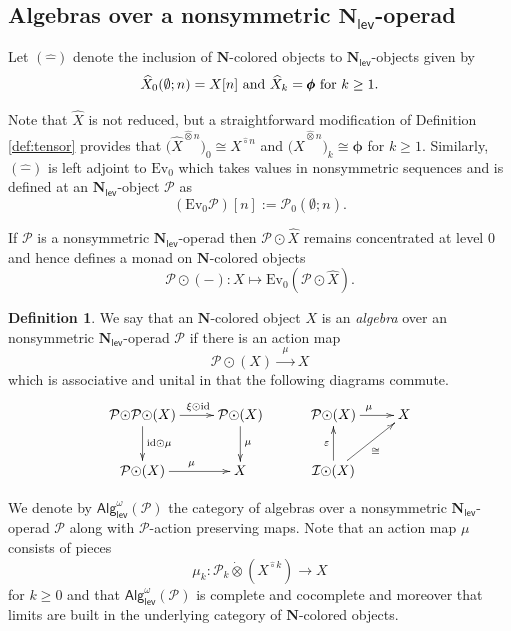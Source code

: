 \documentclass[11pt]{amsart}
\theoremstyle{definition}
\newtheorem{definition}[subsection]{Definition}
\theoremstyle{remark}
\newcommand{\AlgN}[1]{\mathsf{Alg}^{\omega}_{\mathsf{lev}}\left(\mathcal{#1}\right)}
\newcommand{\id}{\mathrm{id}}
\newcommand{\Cal}[1]{\mathcal{#1}}
\newcommand{\circhat}{\hat{\circ}}
\newcommand{\circdot}{{\odot}}
\newcommand{\tensorhat}{\hat{\otimes}}
\newcommand{\tensordot}{\dot{\otimes}}
\newcommand{\Nl}{\mathbf{N}_{\mathsf{lev}}}
\newcommand{\ptC}{\pmb{\phi}}
\begin{document}
\subsection{Algebras over a nonsymmetric $\Nl$-operad}
Let $(\widehat{-})$ denote the inclusion of $\mathbf{N}$-colored objects to $\Nl$-objects given by \[\text{$\widehat{X}_0(\emptyset;n)=X[n]$ and $\widehat{X}_k=\ptC$ for $ k\geq 1$.}\] 

Note that $\widehat{X}$ is not reduced, but a straightforward modification of Definition \ref{def:tensor} provides that $\big(\widehat{X}^{\tensorhat n}\big)_0\cong X^{\circhat n}$ and $\big(\widehat{X}^{\tensorhat n}\big)_k\cong \ptC$ for $k\geq 1$. Similarly, $(\widehat{-})$ is left adjoint to $\mathrm{Ev}_0$ which takes values in nonsymmetric sequences and is defined at an $\Nl$-object $\Cal{P}$ as \[(\mathrm{Ev}_0\Cal{P})[n]:=\Cal{P}_0(\emptyset;n).\] 

If $\Cal{P}$ is a nonsymmetric $\Nl$-operad then $\Cal{P}\circdot \widehat{X}$ remains concentrated at level $0$ and hence defines a monad on $\mathbf{N}$-colored objects \[\Cal{P}\circdot(-)\colon X\mapsto \mathrm{Ev}_0(\Cal{P}\circdot \widehat{X}).\] 

\begin{definition}  \label{def-nonsym}
We say that an $\mathbf{N}$-colored object $X$ is an \textit{algebra} over an nonsymmetric $\Nl$-operad $\mathcal{P}$ if there is an action map \[\mathcal{P}\circdot (X)\xrightarrow{\;\; \mu\;\;} X\] which is associative and unital in that the following diagrams commute. \[ \xymatrix{ \Cal{P}\circdot \Cal{P} \circdot (X) \ar[r]^<(.3){\xi\circdot\id} \ar[d]^{\id\circdot \mu}& \Cal{P}\circdot (X) \ar[d]^{\mu} \\ \Cal{P}\circdot (X)\ar[r]^{\mu} & X } \hspace{1cm} \xymatrix{ \Cal{P}\circdot (X) \ar[r]^{\mu} & X \\ \Cal{I}\circdot (X)  \ar[u]^{\varepsilon} \ar[ur]_{\cong} }\]
\end{definition} 

We denote by $\AlgN{P}$ the category of algebras over a nonsymmetric $\Nl$-operad $\Cal{P}$ along with $\Cal{P}$-action preserving maps. Note that an action map $\mu$ consists of pieces \[\mu_k\colon \mathcal{P}_{k} \tensordot (X^{\circhat k})\to X\] for $k\geq 0$ and that $\AlgN{P}$ is complete and cocomplete and moreover that limits are built in the underlying category of $\mathbf{N}$-colored objects. 

\end{document}
